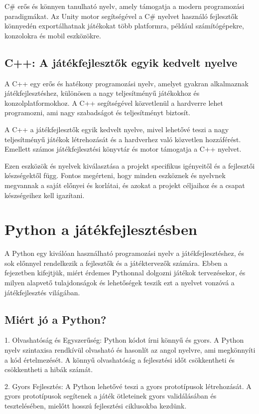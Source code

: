 C\# erős és könnyen tanulható nyelv, amely támogatja a modern programozási paradigmákat. Az Unity motor segítségével a C\# nyelvet használó fejlesztők könnyedén exportálhatnak játékokat több platformra, például számítógépekre, konzolokra és mobil eszközökre.
\subsection{C++: A játékfejlesztők egyik kedvelt nyelve}\cite{cpp-doc}
A C++ egy erős és hatékony programozási nyelv, amelyet gyakran alkalmaznak játékfejlesztéshez, különösen a nagy teljesítményű játékokhoz és konzolplatformokhoz. A C++ segítségével közvetlenül a hardverre lehet programozni, ami nagy szabadságot és teljesítményt biztosít.

A C++ a játékfejlesztők egyik kedvelt nyelve, mivel lehetővé teszi a nagy teljesítményű játékok létrehozását és a hardverhez való közvetlen hozzáférést. Emellett számos játékfejlesztési könyvtár és motor támogatja a C++ nyelvet.

Ezen eszközök és nyelvek kiválasztása a projekt specifikus igényeitől és a fejlesztői készségektől függ. Fontos megérteni, hogy minden eszköznek és nyelvnek megvannak a saját előnyei és korlátai, és azokat a projekt céljaihoz és a csapat készségeihez kell igazítani.



\section{Python a játékfejlesztésben}

A Python egy kiválóan használható programozási nyelv a játékfejlesztéshez, és sok előnnyel rendelkezik a fejlesztők és a játéktervezők számára. Ebben a fejezetben kifejtjük, miért érdemes Pythonnal dolgozni játékok tervezésekor, és milyen alapvető tulajdonságok és lehetőségek teszik ezt a nyelvet vonzóvá a játékfejlesztés világában.

\subsection{Miért jó a Python?}
1. Olvashatóság és Egyszerűség:
Python kódot írni könnyű és gyors. A Python nyelv szintaxisa rendkívül olvasható és hasonlít az angol nyelvre, ami megkönnyíti a kód értelmezését. A könnyű olvashatóság a fejlesztési időt csökkentheti és csökkentheti a hibák számát.

2. Gyors Fejlesztés:
A Python lehetővé teszi a gyors prototípusok létrehozását. A gyors prototípusok segítenek a játék ötleteinek gyors validálásában és tesztelésében, mielőtt hosszú fejlesztési ciklusokba kezdünk.

